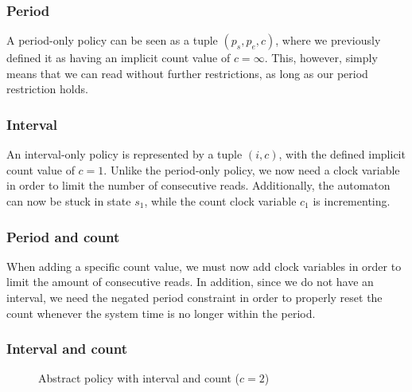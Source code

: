 \subsubsection{Period}
A period-only policy can be seen as a tuple $(p_s, p_e, c)$, where we previously defined it as having an implicit count value of $c = \infty$.
This, however, simply means that we can read without further restrictions, as long as our period restriction holds.

\begin{figure}[H]
  \centering
  
\end{figure}

\subsubsection{Interval}
An interval-only policy is represented by a tuple $(i, c)$, with the defined implicit count value of $c = 1$.
Unlike the period-only policy, we now need a clock variable in order to limit the number of consecutive reads.
Additionally, the automaton can now be stuck in state $s_1$, while the count clock variable $c_1$ is incrementing.

\begin{figure}[H]
  \centering
  
\end{figure}

\subsubsection{Period and count}
When adding a specific count value, we must now add clock variables in order to limit the amount of consecutive reads.
In addition, since we do not have an interval, we need the negated period constraint in order to properly reset the count whenever the system time is no longer within the period.

\begin{figure}[H]
  \centering
  
\end{figure}

\subsubsection{Interval and count}


\begin{figure}[H]
  \centering
  
  \caption{Abstract policy with interval and count ($c = 2$)}
\end{figure}




\begin{figure}[H]
  \centering
  
\end{figure}
